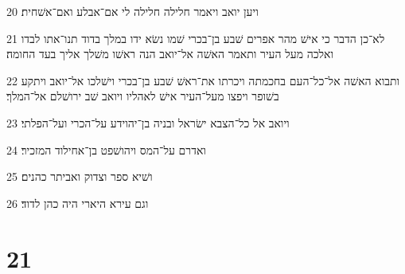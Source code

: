\par 20 ויען יואב ויאמר חלילה חלילה לי אם־אבלע ואם־אשׁחית׃
\par 21 לא־כן הדבר כי אישׁ מהר אפרים שׁבע בן־בכרי שׁמו נשׂא ידו במלך בדוד תנו־אתו לבדו ואלכה מעל העיר ותאמר האשׁה אל־יואב הנה ראשׁו משׁלך אליך בעד החומה׃
\par 22 ותבוא האשׁה אל־כל־העם בחכמתה ויכרתו את־ראשׁ שׁבע בן־בכרי וישׁלכו אל־יואב ויתקע בשׁופר ויפצו מעל־העיר אישׁ לאהליו ויואב שׁב ירושׁלם אל־המלך׃
\par 23 ויואב אל כל־הצבא ישׂראל ובניה בן־יהוידע על־הכרי ועל־הפלתי׃
\par 24 ואדרם על־המס ויהושׁפט בן־אחילוד המזכיר׃
\par 25 ושׁיא ספר וצדוק ואביתר כהנים׃
\par 26 וגם עירא היארי היה כהן לדוד׃

\chapter{21}

